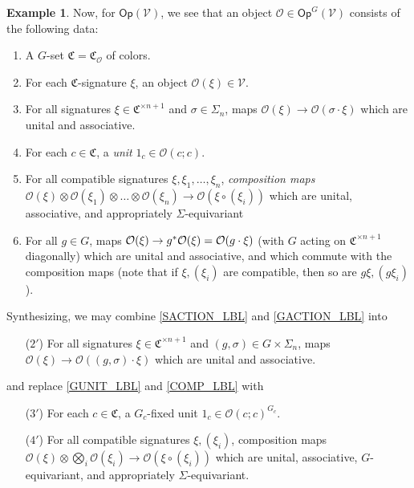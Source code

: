 \documentclass[a4paper,10pt
,draft
]{article}%
\numberwithin{equation}{section}
\numberwithin{figure}{section}
\theoremstyle{definition} %
\newtheorem{example}[equation]{Example}%
\newcommand{\Op}{\mathsf{Op}}%
\newcommand{\V}{\ensuremath{\mathcal V}}
\renewcommand{\O}{\ensuremath{\mathcal O}}
\newcommand{\ksi}{\xi}
\newcommand{\1}{\ensuremath{\mathbbm 1}}%
\begin{document}
\begin{example}
      Now, for $\Op(\V)$,
      we see that an object $\O \in \Op^G(\V)$ consists of the following data:
      \begin{enumerate}[label = (\arabic*), start = 0]
      \item A $G$-set $\mathfrak C = \mathfrak C_{\O}$ of colors.
      \item For each $\mathfrak C$-signature $\ksi$, an object $\O(\ksi) \in \V$.
      \item \label{SACTION_LBL}
            For all signatures $\ksi \in \mathfrak C^{\times n + 1}$ and $\sigma \in \Sigma_n$,
            maps $\O(\ksi) \to \O(\sigma \cdot \ksi)$
            which are unital and associative.
      \item \label{GUNIT_LBL} 
            For each $c \in \mathfrak{C}$, a \textit{unit} $1_c \in \O(c;c)$.
      \item \label{COMP_LBL}
            For all compatible signatures $\ksi, \ksi_1,\dots, \ksi_n$,
            \textit{composition maps} $\O(\ksi) \otimes \O(\ksi_1) \otimes \dots \otimes \O(\ksi_n) \to \O(\ksi \circ (\ksi_i))$
            which are unital, associative, and appropriately $\Sigma$-equivariant
      \item \label{GACTION_LBL}
            For all $g \in G$, maps $\O(\ksi) \to g^{\**}\O(\ksi) = \O(g \cdot \ksi)$
            (with $G$ acting on $\mathfrak C^{\times n+1}$ diagonally)
            which are unital and associative, and which commute with the composition maps
            (note that if $\ksi, (\ksi_i)$ are compatible, then so are $g \ksi, (g \ksi_i)$).
      \end{enumerate}
      Synthesizing, we may combine \ref{SACTION_LBL} and \ref{GACTION_LBL} into
      \begin{enumerate}
      \item[($2'$)] For all signatures $\xi \in \mathfrak C^{\times n+1}$ and $(g,\sigma) \in G\times \Sigma_n$, maps
            $\O(\xi) \to \O((g,\sigma)\cdot \xi)$
            which are unital and associative.
      \end{enumerate}
      
      and replace \ref{GUNIT_LBL} and \ref{COMP_LBL} with
      \begin{enumerate}
      \item[($3'$)] For each $c \in \mathfrak C$, a $G_c$-fixed unit $1_c \in \O(c;c)^{G_c}$.
      \item[($4'$)] For all compatible signatures $\ksi, (\ksi_i)$,
            composition maps $\O(\ksi) \otimes \bigotimes_i \O(\ksi_i) \to \O(\ksi \circ (\ksi_i))$
            which are unital, associative, $G$-equivariant, and appropriately $\Sigma$-equivariant.
      \end{enumerate}
\end{example}
\end{document}

